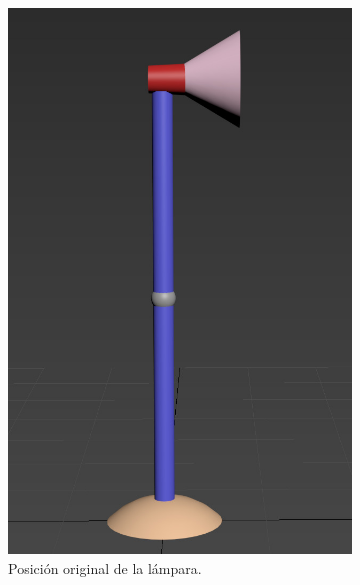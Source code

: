 \documentclass{article}
\begin{document}
 \begin{figure}[H]
     \centering 
 	\begin{subfigure}[H]{0.38\textwidth}
 	    \centering
\includegraphics[width=\textwidth]{imagenes/lamp1.jpg}
\caption{Posición original de la lámpara.}
     \end{subfigure}
     \hfill
 	\begin{subfigure}[H]{0.38\textwidth}
 	    \centering

\end{subfigure}
\end{figure}
\end{document}

